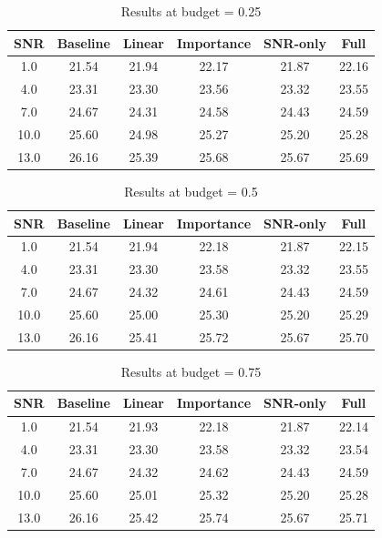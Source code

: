 \begin{table}[h]
\centering
\caption{Results at budget = 0.25}
\begin{tabular}{c|ccccc}
\hline
SNR & Baseline & Linear & Importance & SNR-only & Full \\
\hline
1.0 & 21.54 & 21.94 & 22.17 & 21.87 & 22.16 \\
4.0 & 23.31 & 23.30 & 23.56 & 23.32 & 23.55 \\
7.0 & 24.67 & 24.31 & 24.58 & 24.43 & 24.59 \\
10.0 & 25.60 & 24.98 & 25.27 & 25.20 & 25.28 \\
13.0 & 26.16 & 25.39 & 25.68 & 25.67 & 25.69 \\
\hline
\end{tabular}
\end{table}

\begin{table}[h]
\centering
\caption{Results at budget = 0.5}
\begin{tabular}{c|ccccc}
\hline
SNR & Baseline & Linear & Importance & SNR-only & Full \\
\hline
1.0 & 21.54 & 21.94 & 22.18 & 21.87 & 22.15 \\
4.0 & 23.31 & 23.30 & 23.58 & 23.32 & 23.55 \\
7.0 & 24.67 & 24.32 & 24.61 & 24.43 & 24.59 \\
10.0 & 25.60 & 25.00 & 25.30 & 25.20 & 25.29 \\
13.0 & 26.16 & 25.41 & 25.72 & 25.67 & 25.70 \\
\hline
\end{tabular}
\end{table}

\begin{table}[h]
\centering
\caption{Results at budget = 0.75}
\begin{tabular}{c|ccccc}
\hline
SNR & Baseline & Linear & Importance & SNR-only & Full \\
\hline
1.0 & 21.54 & 21.93 & 22.18 & 21.87 & 22.14 \\
4.0 & 23.31 & 23.30 & 23.58 & 23.32 & 23.54 \\
7.0 & 24.67 & 24.32 & 24.62 & 24.43 & 24.59 \\
10.0 & 25.60 & 25.01 & 25.32 & 25.20 & 25.28 \\
13.0 & 26.16 & 25.42 & 25.74 & 25.67 & 25.71 \\
\hline
\end{tabular}
\end{table}

